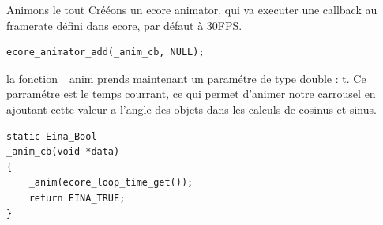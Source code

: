 \documentclass{beamer}
\begin{document}
\begin{frame}[fragile]{Animons le tout}
Crééons un ecore animator, qui va executer une callback au framerate défini dans ecore, par défaut à 30FPS.
\begin{lstlisting}
ecore_animator_add(_anim_cb, NULL);
\end{lstlisting}
la fonction \_anim prends maintenant un paramétre de type double : t. Ce parramétre est le temps courrant, ce qui permet d'animer notre carrousel en ajoutant cette valeur a l'angle des objets dans les calculs de cosinus et sinus.
\begin{lstlisting}
static Eina_Bool
_anim_cb(void *data)
{
    _anim(ecore_loop_time_get());
    return EINA_TRUE;
}
\end{lstlisting}
\end{frame}
\end{document}
